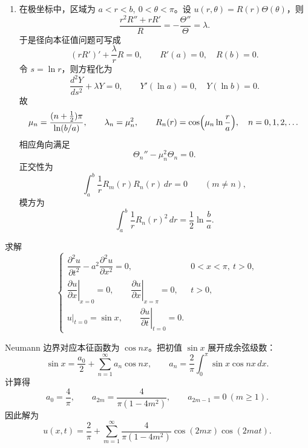 \begin{question}[回答以下问题]
\begin{solution}
\begin{enumerate}[label=(\arabic*),leftmargin=2.6em,itemsep=0.25em,topsep=0.2em]
\item 在极坐标中，区域为 $a<r<b,\ 0<\theta<\pi$。设 $u(r,\theta)=R(r)\Theta(\theta)$，则
\[
\frac{r^2R''+rR'}{R}=-\frac{\Theta''}{\Theta}=\lambda.
\]
于是径向本征值问题可写成
\[
(rR')'+\frac{\lambda}{r}R=0,
\qquad R'(a)=0,\quad R(b)=0.
\]
令 $s=\ln r$，则方程化为
\[
\frac{d^2Y}{ds^2}+\lambda Y=0,
\qquad Y'(\ln a)=0,\quad Y(\ln b)=0.
\]
故
\[
\mu_n=\frac{(n+\tfrac12)\pi}{\ln(b/a)},
\qquad \lambda_n=\mu_n^2,
\qquad R_n(r)=\cos\Bigl(\mu_n\ln\frac{r}{a}\Bigr),
\quad n=0,1,2,\dots
\]
相应角向满足
\[
\Theta_n''-\mu_n^2\Theta_n=0.
\]
正交性为
\[
\int_a^b \frac{1}{r}R_m(r)R_n(r)\,dr=0\qquad (m\ne n),
\]
模方为
\[
\int_a^b \frac{1}{r}R_n(r)^2\,dr=\frac12\ln\frac{b}{a}.
\]
\end{enumerate}


\end{solution}
\end{question}

\begin{question}[定解问题（三）]

求解
\[
\begin{cases}
\dfrac{\partial^2u}{\partial t^2}-a^2\dfrac{\partial^2u}{\partial x^2}=0,
&0<x<\pi,\ t>0,\\
\left.\dfrac{\partial u}{\partial x}\right|_{x=0}=0,
\qquad \left.\dfrac{\partial u}{\partial x}\right|_{x=\pi}=0,
&t>0,\\
u|_{t=0}=\sin x,
\qquad \left.\dfrac{\partial u}{\partial t}\right|_{t=0}=0.
\end{cases}
\]

\begin{solution}

Neumann 边界对应本征函数为 $\cos nx$。把初值 $\sin x$ 展开成余弦级数：
\[
\sin x=\frac{a_0}{2}+\sum_{n=1}^{\infty}a_n\cos nx,
\qquad
 a_n=\frac{2}{\pi}\int_0^{\pi}\sin x\cos nx\,dx.
\]
计算得
\[
 a_0=\frac{4}{\pi},
 \qquad a_{2m}=\frac{4}{\pi(1-4m^2)},
 \qquad a_{2m-1}=0\ (m\ge1).
\]
因此解为
\[
 u(x,t)=\frac{2}{\pi}+
 \sum_{m=1}^{\infty}\frac{4}{\pi(1-4m^2)}
 \cos(2mx)\cos(2ma t).
\]


\end{solution}
\end{question}

